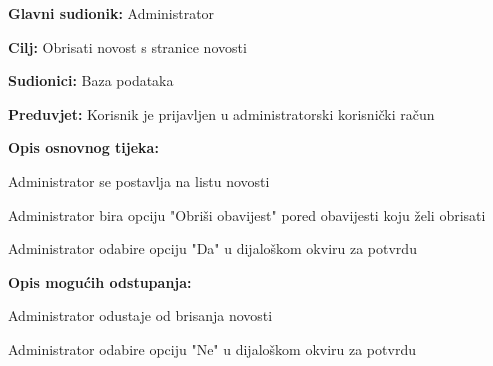 		\noindent {}
		\begin{packed_item}
		
			\item \textbf{Glavni sudionik: } Administrator
			\item  \textbf{Cilj: } Obrisati novost s stranice novosti
			\item  \textbf{Sudionici: } Baza podataka
			\item  \textbf{Preduvjet: } Korisnik je prijavljen u administratorski korisnički račun
			\item  \textbf{Opis osnovnog tijeka:}
		
			\item[] \begin{packed_enum}
			
				\item Administrator se postavlja na listu novosti
				\item Administrator bira opciju "Obriši obavijest" pored obavijesti koju želi obrisati
				\item Administrator odabire opciju "Da" u dijaloškom okviru za potvrdu
			\end{packed_enum}
	
			\item  \textbf{Opis mogućih odstupanja:}
		
			\item[] \begin{packed_item}
			
				\item[3.a] Administrator odustaje od brisanja novosti
				\item[] \begin{packed_enum}
				
					\item Administrator odabire opciju "Ne" u dijaloškom okviru za potvrdu
				
				\end{packed_enum}
			\end{packed_item}
	
		\end{packed_item}

